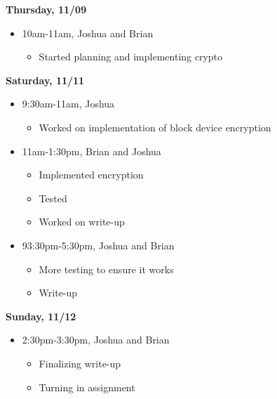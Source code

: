 \documentclass[letterpaper, onecolumn, draftclsnofoot, 10pt, compsoc]{IEEEtran}
\begin{document}
\begin{singlespace}
\begin{itemize}
            \end{itemize}
        \textbf{Thursday, 11/09}
            \begin{itemize}
                \item 10am-11am, Joshua and Brian 
                \begin{itemize}
                    \item Started planning and implementing crypto 
                \end{itemize}
            \end{itemize}
        \textbf{Saturday, 11/11}
            \begin{itemize}
                \item 9:30am-11am, Joshua
                \begin{itemize}
                    \item Worked on implementation of block device encryption
                \end{itemize}
                \item 11am-1:30pm, Brian and Joshua
                \begin{itemize}
                    \item Implemented encryption
                    \item Tested 
                    \item Worked on write-up 
                \end{itemize}
                \item 93:30pm-5:30pm, Joshua and Brian 
                \begin{itemize}
                    \item More testing to ensure it works 
                    \item Write-up
                \end{itemize}
            \end{itemize}
        \textbf{Sunday, 11/12}
            \begin{itemize}
                \item 2:30pm-3:30pm, Joshua and Brian
                \begin{itemize}
                    \item Finalizing write-up
                    \item Turning in assignment
                \end{itemize}
            \end{itemize}
    \end{singlespace}
        
\end{document}
